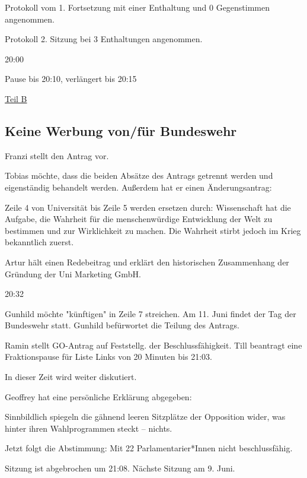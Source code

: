 \documentclass[ngerman,headheight=70pt]{scrartcl}
\begin{document}
    Protokoll vom 1. Fortsetzung mit einer Enthaltung und 0 Gegenstimmen
    angenommen.

    Protokoll 2. Sitzung bei 3 Enthaltungen angenommen.

    20:00

    Pause bis 20:10, verlängert bis 20:15

    \vspace{0.5cm}
    {\Large \underline{Teil B}}


    \subsection{Keine Werbung von/für Bundeswehr}

    Franzi stellt den Antrag vor.

    Tobias möchte, dass die beiden Absätze des Antrags getrennt werden
    und eigenständig behandelt werden. Außerdem hat er einen Änderungsantrag:

    Zeile 4 von Universität bis Zeile 5 werden ersetzen durch:
    Wissenschaft hat die Aufgabe, die Wahrheit für die menschenwürdige
    Entwicklung der Welt zu bestimmen und zur Wirklichkeit zu machen. Die
    Wahrheit stirbt jedoch im Krieg bekanntlich zuerst.

    Artur hält einen Redebeitrag und erklärt den historischen Zusammenhang
    der Gründung der Uni Marketing GmbH.

    20:32

    Gunhild möchte "künftigen" in Zeile 7 streichen. Am 11. Juni findet
    der Tag der Bundeswehr statt. Gunhild befürwortet die Teilung des Antrags.

    Ramin stellt GO-Antrag auf Feststellg. der Beschlussfähigkeit. Till beantragt
    eine Fraktionspause für Liste Links von 20 Minuten bis 21:03.

    In dieser Zeit wird weiter diskutiert.

    Geoffrey hat eine persönliche Erklärung abgegeben:

    Sinnbildlich spiegeln die gähnend leeren Sitzplätze der Opposition
    wider, was hinter ihren Wahlprogrammen steckt -- nichts.

    Jetzt folgt die Abstimmung: Mit 22 Parlamentarier*Innen nicht beschlussfähig.

    Sitzung ist abgebrochen um 21:08. Nächste Sitzung am 9. Juni.
\end{document}
